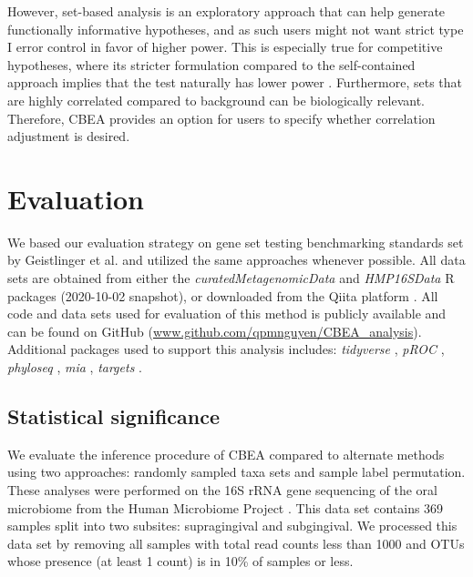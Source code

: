However, set-based analysis is an exploratory approach that can help generate functionally informative hypotheses, and as such users might not want strict type I error control in favor of higher power. This is especially true for competitive hypotheses, where its stricter formulation compared to the self-contained approach implies that the test naturally has lower power \cite{goeman2007, ackerman2009}. Furthermore, sets that are highly correlated compared to background can be biologically relevant. Therefore, CBEA provides an option for users to specify whether correlation adjustment is desired. 

\section{Evaluation} \label{evaluation}
We based our evaluation strategy on gene set testing benchmarking standards set by Geistlinger et al. \cite{geistlinger2021} and utilized the same approaches whenever possible. All data sets are obtained from either the \emph{curatedMetagenomicData} \cite{pasolli2017} and \emph{HMP16SData} \cite{schiffer2019} R packages (2020-10-02 snapshot), or downloaded from the Qiita platform \cite{gonzalez2018}. All code and data sets used for evaluation of this method is publicly available and can be found on GitHub (\url{www.github.com/qpmnguyen/CBEA_analysis}). Additional packages used to support this analysis includes: \emph{tidyverse} \cite{wickham2019}, \emph{pROC} \cite{robin2011}, \emph{phyloseq} \cite{mcmurdie2014}, \emph{mia} \cite{ernst2021}, \emph{targets} \cite{landau2021}.   

\subsection{Statistical significance}
We evaluate the inference procedure of CBEA compared to alternate methods using two approaches: randomly sampled taxa sets and sample label permutation. These analyses were performed on the 16S rRNA gene sequencing of the oral microbiome from the Human Microbiome Project \cite{consortium2012, proctor2019}. This data set contains 369 samples split into two subsites: supragingival and subgingival. We processed this data set by removing all samples with total read counts less than 1000 and OTUs whose presence (at least 1 count) is in 10\% of samples or less.  

